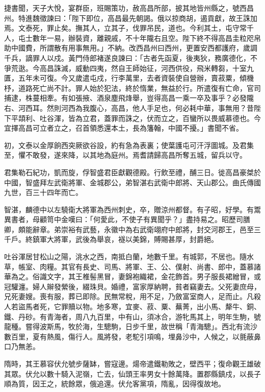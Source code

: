 \begin{pinyinscope}
 捷書聞，天子大悅，宴群臣，班賜策功，赦高昌所部，披其地皆州縣之，號西昌州。特進魏徵諫曰：「陛下即位，高昌最先朝謁。俄以掠商胡，遏貢獻，故王誅加焉。文泰死，罪止矣。撫其人，立其子，伐罪吊民，道也。今利其土，屯守常千人，屯士數年一易，辦裝資，離親戚，不十年隴右且空。陛下終不得高昌圭粒咫帛助中國費，所謂散有用事無用。」不納。改西昌州曰西州，更置安西都護府，歲調千兵，謫罪人以戍。黃門侍郎褚遂良諫曰：「古者先函夏，後夷狄，務廣德化，不爭荒逖。今高昌誅滅，威動四夷，然自王師始征，河西供役，飛米轉芻，十室九匱，五年未可復。今又歲遣屯戍，行李萬里，去者資裝使自營辦，賣菽粟，傾機杼，道路死亡尚不計。罪人始於犯法，終於惰業，無益於行。所遣復有亡命，官司捕逮，株蔓相牽。有如張掖、酒泉塵飛烽舉，豈得高昌一乘一卒及事乎？必發隴右、河西耳。然則河西為我腹心，高昌，他人手足也，何必耗中華，事無用？昔陛下平頡利、吐谷渾，皆為立君，蓋罪而誅之，伏而立之，百蠻所以畏威慕德也。今宜擇高昌可立者立之，召首領悉還本土，長為籓翰，中國不擾。」書聞不省。



 初，文泰以金厚餉西突厥欲谷設，約有急為表裏；使葉護屯可汗浮圖城。及君集至，懼不敢發，遂來降，以其地為庭州。焉耆請歸高昌所奪五城，留兵以守。



 君集勒石紀功，凱而旋，俘智盛君臣獻觀德殿。行飲至禮，酺三日。徙高昌豪桀於中國，智盛拜左武衛將軍、金城郡公，弟智湛右武衛中郎將、天山郡公。曲氏傳國九世，百三十四年而亡。



 智湛，麟德中以左驍衛大將軍為西州刺史，卒，贈涼州都督。有子昭，好學。有鬻異書者，母顧笥中金嘆曰：「何愛此，不使子有異聞乎？」盡持易之。昭歷司膳卿，頗能辭章。弟崇裕有武藝，永徽中為右武衛翊府中郎將，封交河郡王，邑至三千戶。終鎮軍大將軍，武後為舉哀，襚以美錦，賻賜甚厚，封爵絕。



 吐谷渾居甘松山之陽，洮水之西，南抵白蘭，地數千里。有城郭，不居也。隨水草，帳室、肉糧。其官有長史、司馬、將軍、王、公、僕射、尚書、郎中，蓋慕諸華為之。俗識文字，其王椎髻黑冒，妻錦袍織裙，金花飾首。男子服長裙繒冒，或冠驩瀍。婦人辮發縈後，綴珠貝。婚禮，富家厚納聘，貧者竊妻去。父死妻庶母，兄死妻嫂。喪有服，葬已即除。民無常稅，用不足，乃斂富室商人，足而止。凡殺人若盜馬者死，它罪贖以物。地多寒，宜麥、菽、粟、蕪菁，出小馬、犛牛、銅、鐵、丹砂。有青海者，周八九百里，中有山，須冰合，游牝馬其上，明年生駒，號龍種。嘗得波斯馬，牧於海，生驄駒，日步千里，故世稱「青海驄」。西北有流沙數百里，夏有熱風，傷行人。風將發，老駝引項鳴，埋鼻沙中，人候之，以氈蔽鼻口乃無恙。



 隋時，其王慕容伏允號步薩缽，嘗寇邊。煬帝遣鐵勒敗之，壁西平；復命觀王雄破其眾。伏允以數十騎入泥嶺，亡去，仙頭王率男女十餘萬降。置郡縣鎮戍，以長子順為質，因王之，統餘眾，俄追還。伏允客黨項，隋亂，因得復故地。




\end{pinyinscope}
